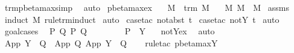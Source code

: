 \begin{isabellebody}
\isamarkupfalse%
\ trm{\isacharunderscore}pbeta{\isacharunderscore}max{\isacharunderscore}simp{}\ \isamarkupfalse%
\ auto%
\endisatagproof
{\isafoldproof}%
%
\isadelimproof
\isanewline
%
\endisadelimproof
\isanewline
{}\isamarkupfalse%
\ pbeta{\isacharunderscore}max{\isacharunderscore}ex{\isacharcolon}\isanewline
\ \ \ M\ \ {\isachardoublequoteopen}trm\ M{\isachardoublequoteclose}\isanewline
\ \ \ {\isachardoublequoteopen}{\isasymexists}M{\isacharprime}{\isachardot}\ M\ {\isachargreater}{\isachargreater}{\isachargreater}\ M{\isacharprime}{\isachardoublequoteclose}\isanewline
%
\isadelimproof
%
\endisadelimproof
%
\isatagproof
{}\isamarkupfalse%
\ assms\ \isamarkupfalse%
\ {\isacharparenleft}induct\ M\ rule{\isacharcolon}trm{\isachardot}induct{\isacharparenright}\isanewline
{}\isamarkupfalse%
\ auto\isanewline
{}\isamarkupfalse%
\ {\isacharparenleft}case{\isacharunderscore}tac\ {\isachardoublequoteopen}not{\isacharunderscore}abst\ t{}{\isachardoublequoteclose}{\isacharparenright}\isanewline
{}\isamarkupfalse%
\ {\isacharparenleft}case{\isacharunderscore}tac\ {\isachardoublequoteopen}not{\isacharunderscore}Y\ t{}{\isachardoublequoteclose}{\isacharparenright}\isanewline
{}\isamarkupfalse%
\ auto{\isacharbrackleft}{}{\isacharbrackright}\isanewline
{}\isamarkupfalse%
\ goal{\isacharunderscore}cases\isanewline
{}\isamarkupfalse%
\ {\isacharparenleft}{}\ P\ Q\ P{\isacharprime}\ Q{\isacharprime}{\isacharparenright}\isanewline
\ \ \isamarkupfalse%
\ \isamarkupfalse%
\ {\isasymsigma}\ \ {}{\isacharcolon}\ {\isachardoublequoteopen}P\ {\isacharequal}\ Y\ {\isasymsigma}{\isachardoublequoteclose}\ \isamarkupfalse%
\ not{\isacharunderscore}Y{\isacharunderscore}ex\ \isamarkupfalse%
\ auto\isanewline
\ \ \isamarkupfalse%
\ {\isachardoublequoteopen}App\ {\isacharparenleft}Y\ {\isasymsigma}{\isacharparenright}\ Q\ {\isachargreater}{\isachargreater}{\isachargreater}\ App\ Q{\isacharprime}\ {\isacharparenleft}App\ {\isacharparenleft}Y\ {\isasymsigma}{\isacharparenright}\ Q{\isacharprime}{\isacharparenright}{\isachardoublequoteclose}\isanewline
\ \ \isamarkupfalse%
\ {\isacharparenleft}rule{\isacharunderscore}tac\ pbeta{\isacharunderscore}max{\isachardot}Y{\isacharparenright}\isanewline

\end{isabellebody}
